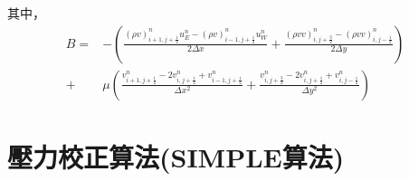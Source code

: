 \documentclass[12pt]{article}
\begin{document}
\noindent 其中，\\
\begin{equation}\begin{split}
    B =& -\left( \frac{(\rho v)_{i+1,j+\frac{1}{2}}^{n}u_{E}^{n} - (\rho v)_{i-1,j+\frac{1}{2}}^{n}u_{W}^{n}}{2\Delta x} + \frac{(\rho v v)_{i,j+\frac{3}{2}}^{n} - (\rho v v)_{i,j-\frac{1}{2}}^{n}}{2\Delta y}\right) \\[1.5ex]
    +& \mu\left( \frac{v_{i+1,j+\frac{1}{2}}^{n}-2v_{i,j+\frac{1}{2}}^{n}+v_{i-1,j+\frac{1}{2}}^{n}}{\Delta x^{2}} + \frac{v_{i,j+\frac{3}{2}}^{n}-2v_{i,j+\frac{1}{2}}^{n}+v_{i,j-\frac{1}{2}}^{n}}{\Delta y^{2}}\right)
\end{split}\end{equation}
\section{壓力校正算法(SIMPLE算法)}
\end{document}
